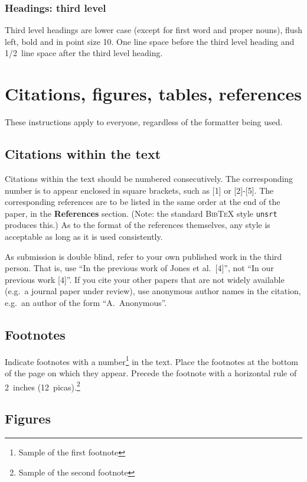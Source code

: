 \documentclass{article} %
\begin{document}
\subsubsection{Headings: third level}

Third level headings are lower case (except for first word and proper nouns),
flush left, bold and in point size 10. One line space before the third level
heading and 1/2~line space after the third level heading.

\section{Citations, figures, tables, references}
\label{others}

These instructions apply to everyone, regardless of the formatter being used.

\subsection{Citations within the text}

Citations within the text should be numbered consecutively. The corresponding
number is to appear enclosed in square brackets, such as [1] or [2]-[5]. The
corresponding references are to be listed in the same order at the end of the
paper, in the \textbf{References} section. (Note: the standard
\textsc{Bib\TeX} style \texttt{unsrt} produces this.) As to the format of the
references themselves, any style is acceptable as long as it is used
consistently.

As submission is double blind, refer to your own published work in the 
third person. That is, use ``In the previous work of Jones et al.\ [4]'',
not ``In our previous work [4]''. If you cite your other papers that
are not widely available (e.g.\ a journal paper under review), use
anonymous author names in the citation, e.g.\ an author of the
form ``A.\ Anonymous''. 


\subsection{Footnotes}

Indicate footnotes with a number\footnote{Sample of the first footnote} in the
text. Place the footnotes at the bottom of the page on which they appear.
Precede the footnote with a horizontal rule of 2~inches
(12~picas).\footnote{Sample of the second footnote}

\subsection{Figures}
\end{document}
